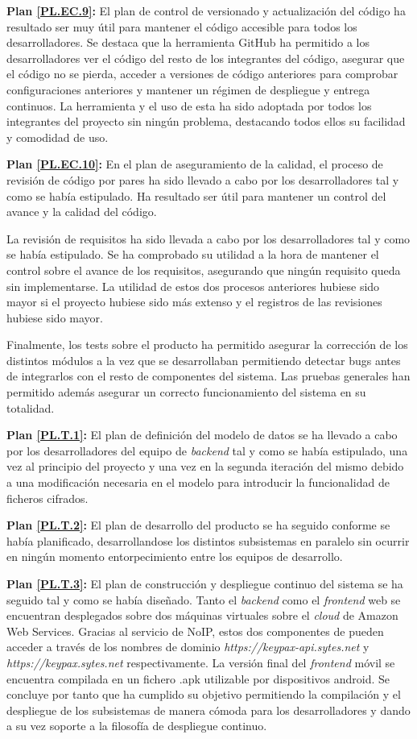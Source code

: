 \documentclass{article}
\begin{document}
\textbf{Plan \ref{PL.EC.9}:}
El plan de control de versionado y actualización del código ha resultado ser muy útil para mantener el código accesible para todos los desarrolladores. Se destaca que la herramienta GitHub ha permitido a los desarrolladores ver el código del resto de los integrantes del código, asegurar que el código no se pierda, acceder a versiones de código anteriores para comprobar configuraciones anteriores y mantener un régimen de despliegue y entrega continuos. La herramienta y el uso de esta ha sido adoptada por todos los integrantes del proyecto sin ningún problema, destacando todos ellos su facilidad y comodidad de uso.

\textbf{Plan \ref{PL.EC.10}:} 
En el plan de aseguramiento de la calidad, el proceso de revisión de código por pares ha sido llevado a cabo por los desarrolladores tal y como se había estipulado. Ha resultado ser útil para mantener un control del avance y la calidad del código.

La revisión de requisitos ha sido llevada a cabo por los desarrolladores tal y como se había estipulado.
Se ha comprobado su utilidad a la hora de mantener el control sobre el avance de los requisitos, asegurando que ningún requisito queda sin implementarse.
La utilidad de estos dos procesos anteriores hubiese sido mayor si el proyecto hubiese sido más extenso y el registros de las revisiones hubiese sido mayor.

Finalmente, los tests sobre el producto ha permitido asegurar la corrección de los distintos módulos a la vez que se desarrollaban permitiendo detectar bugs antes de integrarlos con el resto de componentes del sistema. Las pruebas generales han permitido además asegurar un correcto funcionamiento del sistema en su totalidad.

\textbf{Plan \ref{PL.T.1}:} 
El plan de definición del modelo de datos se ha llevado a cabo por los desarrolladores del equipo de \textit{backend} tal y como se había estipulado, una vez al principio del proyecto y una vez en la segunda iteración del mismo debido a una modificación necesaria en el modelo para introducir la funcionalidad de ficheros cifrados.

\textbf{Plan \ref{PL.T.2}:} 
El plan de desarrollo del producto se ha seguido conforme se había planificado, desarrollandose los distintos subsistemas en paralelo sin ocurrir en ningún momento entorpecimiento entre los equipos de desarrollo.

\textbf{Plan \ref{PL.T.3}:} 
El plan de construcción y despliegue continuo del sistema se ha seguido tal y como se había diseñado.
Tanto el \textit{backend} como el \textit{frontend} web se encuentran desplegados sobre dos máquinas virtuales sobre el \textit{cloud} de Amazon Web Services. Gracias al servicio de NoIP, estos dos componentes de pueden acceder a través de los nombres de dominio \textit{https://keypax-api.sytes.net} y \textit{https://keypax.sytes.net} respectivamente.
La versión final del \textit{frontend} móvil se encuentra compilada en un fichero .apk utilizable por dispositivos android.
Se concluye por tanto que ha cumplido su objetivo permitiendo la compilación y el despliegue de los subsistemas de manera cómoda para los desarrolladores y dando a su vez soporte a la filosofía de despliegue continuo.
\end{document}
